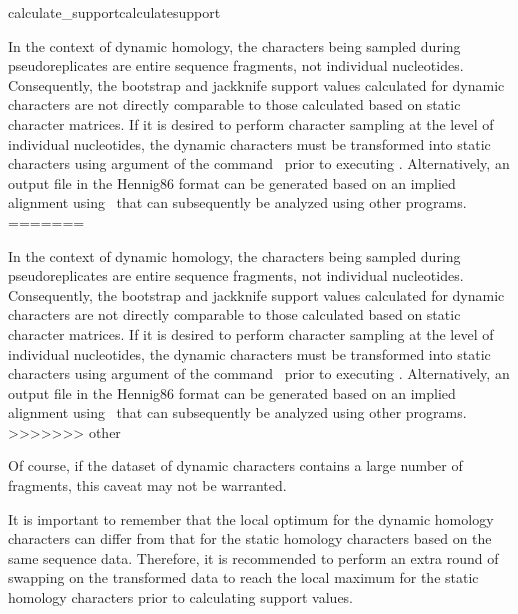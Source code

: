 \begin{command}{calculate\_support}{calculatesupport}
\begin{statement}
                In the context of dynamic
                homology, the characters being sampled during pseudoreplicates
                are entire sequence fragments, not individual nucleotides.
                Consequently, the bootstrap and jackknife support values
                calculated for dynamic characters are not directly comparable to
                those calculated based on static character matrices. If it is
                desired to perform character sampling at the level of
                individual nucleotides, the dynamic characters must be
                transformed into static characters using 
                argument of the command~
                prior to executing . Alternatively, an 
                output file in the Hennig86 format can be
                generated based on an implied alignment
                using~ that can subsequently be analyzed
                using other programs.  
=======
    \begin{statement}
        In the context of dynamic homology, the characters being sampled during
        pseudoreplicates are entire sequence fragments, not individual nucleotides.
        Consequently, the bootstrap and jackknife support values calculated for
        dynamic characters are not directly comparable to those calculated based
        on static character matrices. If it is desired to perform character
        sampling at the level of individual nucleotides, the dynamic characters
        must be transformed into static characters using 
        argument of the command~ prior to executing
        . Alternatively, an output file in the
        Hennig86 format can be generated based on an implied alignment
        using~ that can subsequently be analyzed using other
        programs.  
>>>>>>> other
                
        \indent Of course, if the dataset of dynamic characters contains a large
        number of fragments, this caveat may not be warranted.
                
        \indent It is important to remember that the local optimum for the dynamic
        homology characters can differ from that for the static homology characters
        based on the same sequence data. Therefore, it is recommended to perform 
        an extra round of swapping on the transformed data to reach the local 
        maximum for the static homology characters prior to calculating support values.
    \end{statement}
          

\end{statement}
\end{command}
